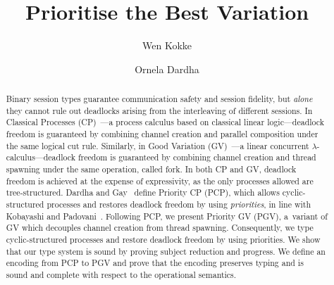 \documentclass{lmcs}
\begin{document}
%
\title{Prioritise the Best Variation}
%
%
\author[W.~Kokke]{Wen Kokke}
\author[O.~Dardha]{Ornela Dardha}
%
%
%
%
\begin{abstract}
  Binary session types guarantee communication safety and session fidelity, but \emph{alone} they cannot rule out deadlocks arising from the interleaving of {different} sessions.
  In Classical Processes (CP)~\cite{wadler14}---a process calculus based on classical linear logic---deadlock freedom is guaranteed by combining channel creation and parallel composition under the same logical cut rule. Similarly, in Good Variation (GV)~\cite{wadler15,lindleymorris15}---a linear concurrent $\lambda$-calculus---deadlock freedom is guaranteed by combining channel creation and thread spawning under the same operation, called fork.
  In both CP and GV, deadlock freedom is achieved at the expense of expressivity, as the only processes allowed are tree-structured. Dardha and Gay~\cite{dardhagay18} define Priority CP (PCP), which allows cyclic-structured processes and restores deadlock freedom by using \emph{priorities}, in line with Kobayashi and Padovani~\cite{kobayashi06,padovani14}.
  Following PCP, we present Priority GV (PGV), a~variant of GV which decouples channel creation from thread spawning. Consequently, we type cyclic-structured processes and restore deadlock freedom by using priorities. We show that our type system is sound by proving subject reduction and progress. We define an encoding from PCP to PGV and prove that the encoding preserves typing and is sound and complete with respect to the operational semantics.
  \end{abstract}
%
\maketitle

{}
{}
{}
{}
{}

\clearpage


\end{document}
